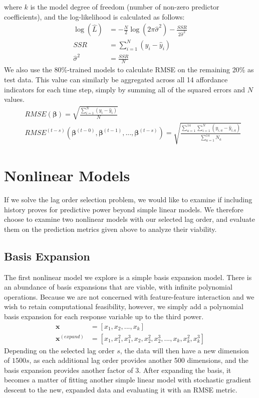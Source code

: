 \documentclass[11pt]{article}
\begin{document}
where $k$ is the model degree of freedom (number of non-zero predictor coefficients), and the log-likelihood is calculated as follows:
\begin{align*}
\log(\hat{L}) &= -\frac{N}{2}\log(2\pi\hat{\sigma}^2) - \frac{SSR}{2\hat{\sigma}^2}\\
SSR &= \sum_{i=1}^N(y_i - \hat{y}_i)\\
\hat{\sigma}^2 &= \frac{SSR}{N}
\end{align*}
We also use the 80\%-trained models to calculate RMSE on the remaining 20\% as test data.  This value can similarly be aggregated across all 14 affordance indicators for each time step, simply by summing all of the squared errors and $N$ values.
\begin{align*}
&RMSE(\boldsymbol\beta) = \sqrt{\frac{\sum_{i=1}^N(y_i - \hat{y}_i)}{N}}\\
&RMSE^{(t-s)}(\boldsymbol\beta^{(t-0)}, \boldsymbol\beta^{(t-1)}, ..., \boldsymbol\beta^{(t-s)}) = \sqrt{\frac{\sum_{a=1}^{14}\sum_{i=1}^N(y_{i, a} - \hat{y}_{i, a})}{\sum_{a=1}^{14}N_a}}
\end{align*}
\section{Nonlinear Models}\label{sec:nonlinear}
If we solve the lag order selection problem, we would like to examine if including history proves for predictive power beyond simple linear models.  We therefore choose to examine two nonlinear models with our selected lag order, and evaluate them on the prediction metrics given above to analyze their viability.
\subsection{Basis Expansion}
The first nonlinear model we explore is a simple basis expansion model.  There is an abundance of basis expansions that are viable, with infinite polynomial operations.  Because we are not concerned with feature-feature interaction and we wish to retain computational feasibility, however, we simply add a polynomial basis expansion for each response variable up to the third power.
\begin{align*}
\mathbf{x} &= [x_1, x_2, ..., x_k]\\
\mathbf{x}^{(expand)} &= [x_1, x_1^2, x_1^3, x_2, x_2^2, x_2^3, ..., x_k, x_k^2, x_k^3]
\end{align*}
Depending on the selected lag order $s$, the data will then have a new dimension of $1500s$, as each additional lag order provides another 500 dimensions, and the basis expansion provides another factor of 3.  After expanding the basis, it becomes a matter of fitting another simple linear model with stochastic gradient descent to the new, expanded data and evaluating it with an RMSE metric.\par
\end{document}
